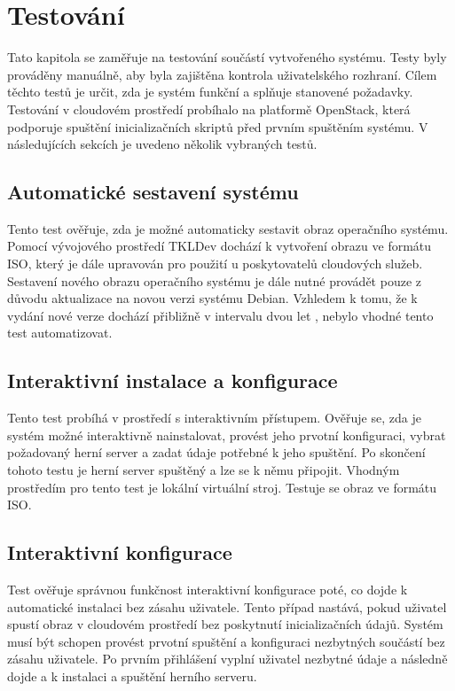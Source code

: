 \chapter{Testování}

Tato kapitola se zaměřuje na testování součástí vytvořeného systému. Testy byly prováděny
manuálně, aby byla zajištěna kontrola uživatelského rozhraní. Cílem těchto testů je určit,
zda je systém funkční a splňuje stanovené požadavky.
Testování v cloudovém prostředí probíhalo na platformě OpenStack, která podporuje spuštění
inicializačních skriptů před prvním spuštěním systému.
V následujících sekcích je uvedeno několik
vybraných testů.

\section{Automatické sestavení systému}

Tento test ověřuje, zda je možné automaticky sestavit obraz operačního systému. Pomocí vývojového prostředí
TKLDev dochází k vytvoření obrazu ve formátu ISO, který je dále upravován pro použití u poskytovatelů
cloudových služeb. Sestavení nového obrazu operačního systému je dále nutné provádět pouze z důvodu
aktualizace na novou verzi systému Debian. Vzhledem k tomu, že k vydání nové verze dochází přibližně
v intervalu dvou let \cite{debian_release_stats}, nebylo vhodné tento test automatizovat.

\section{Interaktivní instalace a konfigurace}

Tento test probíhá v prostředí s interaktivním přístupem. Ověřuje se, zda je systém možné interaktivně nainstalovat, provést jeho
prvotní konfiguraci, vybrat požadovaný herní server a zadat údaje potřebné k jeho spuštění. Po skončení tohoto testu
je herní server spuštěný a lze se k němu připojit. Vhodným prostředím pro tento test je lokální virtuální stroj.
Testuje se obraz ve formátu ISO.

\section{Interaktivní konfigurace}

Test ověřuje správnou funkčnost interaktivní konfigurace poté, co dojde k automatické instalaci bez zásahu uživatele.
Tento případ nastává, pokud uživatel spustí obraz v cloudovém prostředí bez poskytnutí inicializačních údajů. Systém
musí být schopen provést prvotní spuštění a konfiguraci nezbytných součástí bez zásahu uživatele.
Po prvním přihlášení vyplní uživatel nezbytné údaje a následně dojde a k instalaci a spuštění herního serveru.

